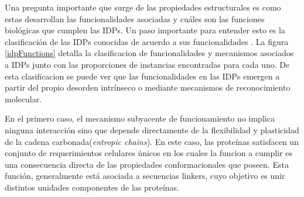 \indent Una pregunta importante que surge de las propiedades estructurales es como estas desarrollan las funcionalidades asociadas y cuáles son las funciones biológicas que cumplen las IDPs.
Un paso importante para entender esto es la clasificación de las IDPs conocidas de acuerdo a sus funcionalidades \cite{van2014classification}.
La figura \ref{idpFunctions} detalla la clasificacion de funcionalidades y mecanismos asociados a IDPs junto con las proporciones de instancias encontradas para cada uno.
De esta clasificacion se puede ver que las funcionalidades en las IDPs emergen a partir del propio desorden intrínseco o mediante mecanismos de reconocimiento molecular.

En el primero caso, el mecanismo subyacente de funcionamiento no implica ninguna interacción sino que depende directamente de la flexibilidad y plasticidad de la cadena carbonada(\textit{entropic chains}).
En este caso, las proteínas satisfacen un conjunto de requerimientos celulares únicos en los cuales la funcion a cumplir es una consecuencia directa de las propiedades conformacionales que poseen. 
Esta función, generalmente está asociada a secuencias linkers, cuyo objetivo es unir distintos unidades componentes de las proteínas.

